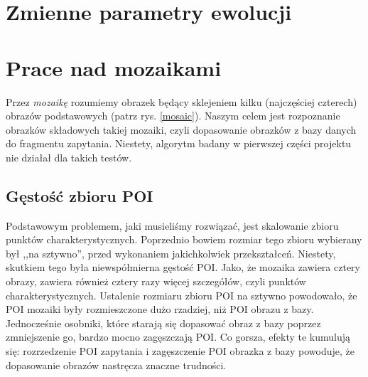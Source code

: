 \documentclass[a4paper,12pt,leqno]{article}
\begin{document}
\section{Zmienne parametry ewolucji}

\section{Prace nad mozaikami}

Przez \textit{mozaikę} rozumiemy obrazek będący sklejeniem kilku (najczęściej czterech) obrazów podstawowych (patrz rys. \ref{mosaic}).
Naszym celem jest rozpoznanie obrazków składowych takiej mozaiki, czyli dopasowanie obrazków z bazy danych do fragmentu zapytania.
Niestety, algorytm badany w pierwszej części projektu nie działał dla takich testów.

\subsection{Gęstość zbioru POI}
Podstawowym problemem, jaki musieliśmy rozwiązać, jest skalowanie zbioru punktów charakterystycznych. 
Poprzednio bowiem rozmiar tego zbioru wybierany był ,,na sztywno'', przed wykonaniem jakichkolwiek przekształceń. Niestety, skutkiem tego była niewspółmierna gęstość POI. Jako, że mozaika
zawiera cztery obrazy, zawiera również cztery razy więcej szczegółów, czyli punktów charakterystycznych. Ustalenie rozmiaru zbioru POI na sztywno powodowało, że POI mozaiki
były rozmieszczone dużo rzadziej, niż POI obrazu z bazy. Jednocześnie osobniki, które starają się dopasować obraz z bazy poprzez zmniejszenie go, bardzo mocno zagęszczają POI.
Co gorsza, efekty te kumulują się: rozrzedzenie POI zapytania i zagęszczenie POI obrazka z bazy powoduje, że dopasowanie obrazów nastręcza znaczne trudności.
\end{document}
